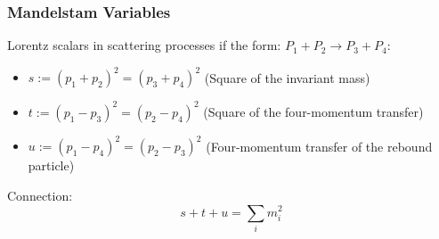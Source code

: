 		\subsubsection{Mandelstam Variables}
			\noindent
			Lorentz scalars in scattering processes if the form: $P_1 + P_2 \rightarrow P_3 + P_4$:
			\begin{itemize}\itemsep -0pt	%
				\item $s:=(p_1+p_2)^2=(p_3+p_4)^2$ \hfill{(Square of the invariant mass)}
				\item $t:=(p_1-p_3)^2=(p_2-p_4)^2$ \hfill{(Square of the four-momentum transfer)}
				\item $u:=(p_1-p_4)^2=(p_2-p_3)^2$ \hfill{(Four-momentum transfer of the rebound particle)}
			\end{itemize}

			\noindent
			Connection:
			\begin{equation}
				s+t+u = \sum_i m_i^2
			\end{equation}
